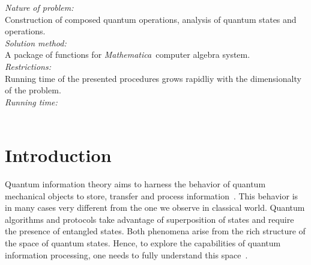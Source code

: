 \documentclass[a4paper,11pt]{elsart}
\newcommand{\Mathematica}{\emph{Mathematica}}
\newcommand{\1}{{\rm 1\hspace{-0.9mm}l}}
\begin{document}
\begin{small}
{\em Nature of problem:}\\
  Construction of composed quantum operations, analysis of quantum states and
  operations.
   \\
{\em Solution method:}\\
  A package of functions for \Mathematica\ computer algebra system.
   \\
{\em Restrictions:}\\
  Running time of the presented procedures grows rapidliy with the dimensionalty
  of the problem.
   \\
{\em Running time:}\\
   \\

\end{small}





\tableofcontents


\section{Introduction}\label{sec:intro}
Quantum information theory aims to harness the behavior of quantum mechanical
objects to store, transfer and process information~\cite{hayashi}. This behavior
is in many cases very different from the one we observe in classical world.
Quantum algorithms and protocols take advantage of superposition of states and
require the presence of entangled states. Both phenomena arise from the rich
structure of the space of quantum states. Hence, to explore the capabilities of
quantum information processing, one needs to fully understand this
space~\cite{BZ06}. 
\end{document}
